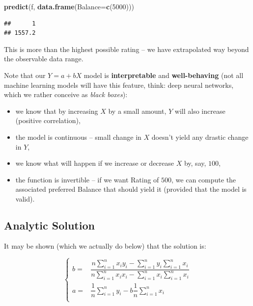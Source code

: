 \documentclass[10pt,b5paper,krantz1]{krantz}
\newenvironment{Shaded}{\begin{snugshade}}{\end{snugshade}}
\newcommand{\DataTypeTok}[1]{\textcolor[rgb]{0.27,0.27,0.27}{#1}}
\newcommand{\DecValTok}[1]{\textcolor[rgb]{0.06,0.06,0.06}{#1}}
\newcommand{\KeywordTok}[1]{\textcolor[rgb]{0.27,0.27,0.27}{\textbf{#1}}}
\newcommand{\NormalTok}[1]{#1}
\begin{document}
\begin{Shaded}
\begin{Highlighting}[]
\KeywordTok{predict}\NormalTok{(f, }\KeywordTok{data.frame}\NormalTok{(}\DataTypeTok{Balance=}\KeywordTok{c}\NormalTok{(}\DecValTok{5000}\NormalTok{)))}
\end{Highlighting}
\end{Shaded}

\begin{verbatim}
##      1 
## 1557.2
\end{verbatim}

This is more than the highest possible rating -- we have extrapolated
way beyond the observable data range.

Note that our \(Y=a+bX\) model is \textbf{interpretable}
and \textbf{well-behaving}
(not all machine learning models will have this feature,
think: deep neural networks,
which we rather conceive as \emph{black boxes}):

\begin{itemize}
\item
  we know that by increasing \(X\) by a small amount,
  \(Y\) will also increase (positive correlation),
\item
  the model is continuous -- small change in \(X\)
  doesn't yield any drastic change in \(Y\),
\item
  we know what will happen if we increase or decrease \(X\) by, say, \(100\),
\item
  the function is invertible -- if we want Rating of \(500\),
  we can compute the associated preferred Balance that should yield it
  (provided that the model is valid).
\end{itemize}

\hypertarget{analytic-solution}{%
\subsection{Analytic Solution}\label{analytic-solution}}

It may be shown (which we actually do below)
that the solution is:

\[
\left\{
\begin{array}{rl}
b  = & \dfrac{
n \displaystyle\sum_{i=1}^n x_i y_i - \displaystyle\sum_{i=1}^n  y_i \displaystyle\sum_{i=1}^n x_i
}{
n \displaystyle\sum_{i=1}^n x_i x_i -   \displaystyle\sum_{i=1}^n x_i\displaystyle\sum_{i=1}^n x_i
}\\
a = & \dfrac{1}{n}\displaystyle\sum_{i=1}^n  y_i - b  \dfrac{1}{n} \displaystyle\sum_{i=1}^n x_i  \\
\end{array}
\right.
\]
\end{document}
